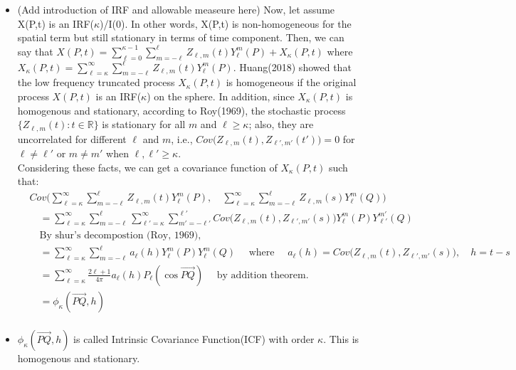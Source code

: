 \documentclass[11pt]{article}
\begin{document}
\begin{itemize}
\item (Add introduction of IRF and allowable measeure here) Now, let assume X(P,t) is an IRF($\kappa$)/I(0). In other words, X(P,t) is non-homogeneous for the spatial term but still stationary in terms of time component. Then, we can say that $X(P,t) = \sum_{\ell=0}^{\kappa-1} \sum_{m=-\ell}^{\ell}Z_{\ell,m}(t)Y_\ell^m(P) + X_\kappa(P,t)$ where $X_\kappa(P,t) =  \sum_{\ell=\kappa}^{\infty} \sum_{m=-\ell}^{\ell} Z_{\ell,m}(t) Y_{\ell}^{m}(P).$ Huang(2018) showed that the low frequency truncated process $X_\kappa(P,t)$ is homogeneous if the original process $X(P,t)$ is an IRF($\kappa$) on the sphere. In addition, since $X_{\kappa}(P,t)$ is homogenous and stationary, according to Roy(1969), the stochastic process $\{Z_{\ell,m}(t) : t \in \mathbb{R} \}$ is stationary for all $m$ and $\ell \ge \kappa$; also, they are uncorrelated for different $\ell$ and $m$, i.e., $Cov\biggl(Z_{\ell,m}(t), Z_{\ell',m'}(t')\biggl)=0$ for $\ell \ne \ell'$ or $m \ne m'$ when $\ell, \ell' \ge \kappa$.\\

Considering these facts, we can get a covariance function of $X_\kappa(P,t)$ such that:\\
\begin{align*}
&Cov\biggl(\sum_{\ell=\kappa}^{\infty} \sum_{m=-\ell}^{\ell} Z_{\ell,m}(t) Y_{\ell}^{m}(P),\quad \sum_{\ell=\kappa}^{\infty} \sum_{m=-\ell}^{\ell} Z_{\ell,m}(s) Y_{\ell}^{m}(Q)\biggl)\\
&\quad = \sum_{\ell=\kappa}^{\infty} \sum_{m=-\ell}^{\ell} \sum_{\ell'=\kappa}^{\infty} \sum_{m'=-\ell'}^{\ell'} Cov\biggl( Z_{\ell,m}(t), Z_{\ell',m'}(s) \biggl) Y_{\ell}^{m}(P) Y_{\ell'}^{m'}(Q)\\
&\quad \text{By shur's decompostion (Roy, 1969), }\\
&\quad = \sum_{\ell=\kappa}^{\infty} \sum_{m=-\ell}^{\ell} a_\ell(h) Y_{\ell}^{m}(P) Y_{\ell}^{m}(Q) \quad \text{ where } \quad a_\ell(h)=Cov\biggl( Z_{\ell,m}(t), Z_{\ell',m'}(s) \biggl), \quad h=t-s\\
&\quad = \sum_{\ell=\kappa}^\infty \frac{2\ell+1}{4\pi} a_\ell(h) P_\ell(\cos\overrightarrow{PQ}) \quad \text{ by addition theorem.}\\
&\quad = \phi_\kappa(\overrightarrow{PQ},h)\\
\end{align*}

\item
$\phi_\kappa(\overrightarrow{PQ},h)$ is called Intrinsic Covariance Function(ICF) with order $\kappa$. This is homogenous and stationary.\\



\end{itemize}
\end{document}
